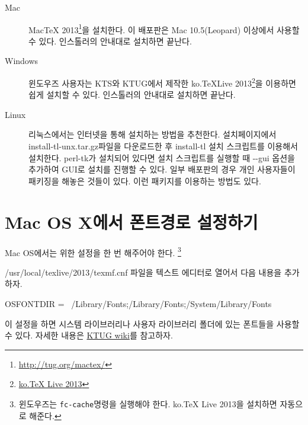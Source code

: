 \documentclass[oneside, chapter, 11pt]{oblivoir}
\newcounter{index}
\begin{document}
\begin{description}
\item[Mac] MacTeX 2013\footnote{\href{http://tug.org/mactex/}{http://tug.org/mactex/}}을 설치한다. 이 배포판은 Mac 10.5(Leopard) 이상에서 사용할 수 있다. 인스톨러의 안내대로 설치하면 끝난다.
\item[Windows] 윈도우즈 사용자는 KTS와 KTUG에서 제작한 ko.TeXLive 2013\footnote{\href{http://www.ktug.org/xe/index.php?mid=KTUG_open_board&document_srl=175806}{ko.TeX Live 2013}}을 이용하면 쉽게 설치할 수 있다. 인스톨러의 안내대로 설치하면 끝난다.
\item[Linux] 리눅스에서는 인터넷을 통해 설치하는 방법을 추천한다. 설치페이지에서 install-tl-unx.tar.gz파일을 다운로드한 후 install-tl 설치 스크립트를 이용해서 설치한다. perl-tk가 설치되어 있다면 설치 스크립트를 실행할 때 -{}-gui 옵션을 추가하여 GUI로 설치를 진행할 수 있다. 일부 배포판의 경우 개인 사용자들이 패키징을 해놓은 것들이 있다. 이런 패키지를 이용하는 방법도 있다.
\end{description}

\section{Mac OS X에서 폰트경로 설정하기}
Mac OS에서는  위한 설정을 한 번 해주어야 한다. \footnote{윈도우즈는 \texttt{fc-cache}명령을 실행해야 한다. ko.TeX Live 2013을 설치하면 자동으로 해준다.}

/usr/local/texlive/2013/texmf.cnf 파일을 텍스트 에디터로 열어서 다음 내용을 추가하자.

\begin{pyglist}[language=bash]
OSFONTDIR = {~/Library/Fonts;/Library/Fonts;/System/Library/Fonts}
\end{pyglist}

이 설정을 하면 시스템 라이브러리나 사용자 라이브러리 폴더에 있는 폰트들을  사용할 수 있다. 
자세한 내용은 \href{http://wiki.ktug.org/wiki/wiki.php/MacOSInstall}{KTUG wiki}를 참고하자.
\end{document}
